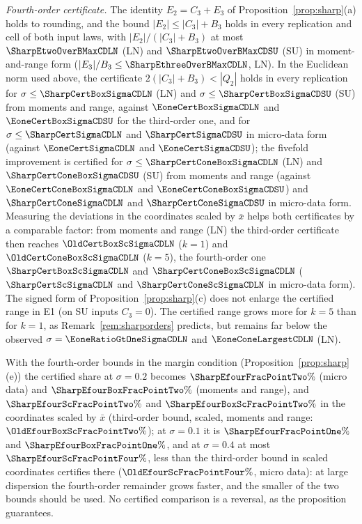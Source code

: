 \emph{Fourth-order certificate.} The identity $E_2=C_3+E_3$ of Proposition~\ref{prop:sharp}(a) holds to rounding, and the bound $|E_2|\le|C_3|+B_3$ holds in every replication and cell of both input laws, with $|E_2|/(|C_3|+B_3)$ at most $\SharpEtwoOverBMaxCDLN$ (LN) and $\SharpEtwoOverBMaxCDSU$ (SU) in moment-and-range form ($|E_3|/B_3\le\SharpEthreeOverBMaxCDLN$, LN). In the Euclidean norm used above, the certificate $2(|C_3|+B_3)<|Q_2|$ holds in every replication for $\sigma\le\SharpCertBoxSigmaCDLN$ (LN) and $\sigma\le\SharpCertBoxSigmaCDSU$ (SU) from moments and range, against $\EoneCertBoxSigmaCDLN$ and $\EoneCertBoxSigmaCDSU$ for the third-order one, and for $\sigma\le\SharpCertSigmaCDLN$ and $\SharpCertSigmaCDSU$ in micro-data form (against $\EoneCertSigmaCDLN$ and $\EoneCertSigmaCDSU$); the fivefold improvement is certified for $\sigma\le\SharpCertConeBoxSigmaCDLN$ (LN) and $\SharpCertConeBoxSigmaCDSU$ (SU) from moments and range (against $\EoneCertConeBoxSigmaCDLN$ and $\EoneCertConeBoxSigmaCDSU$) and $\SharpCertConeSigmaCDLN$ and $\SharpCertConeSigmaCDSU$ in micro-data form. Measuring the deviations in the coordinates scaled by $\bar x$ helps both certificates by a comparable factor: from moments and range (LN) the third-order certificate then reaches $\OldCertBoxScSigmaCDLN$ ($k=1$) and $\OldCertConeBoxScSigmaCDLN$ ($k=5$), the fourth-order one $\SharpCertBoxScSigmaCDLN$ and $\SharpCertConeBoxScSigmaCDLN$ ($\SharpCertScSigmaCDLN$ and $\SharpCertConeScSigmaCDLN$ in micro-data form). The signed form of Proposition~\ref{prop:sharp}(c) does not enlarge the certified range in E1 (on SU inputs $C_3=0$). The certified range grows more for $k=5$ than for $k=1$, as Remark~\ref{rem:sharporders} predicts, but remains far below the observed $\sigma=\EoneRatioGtOneSigmaCDLN$ and $\EoneConeLargestCDLN$ (LN).

With the fourth-order bounds in the margin condition (Proposition~\ref{prop:sharp}(e)) the certified share at $\sigma=0.2$ becomes $\SharpEfourFracPointTwo\%$ (micro data) and $\SharpEfourBoxFracPointTwo\%$ (moments and range), and $\SharpEfourScFracPointTwo\%$ and $\SharpEfourBoxScFracPointTwo\%$ in the coordinates scaled by $\bar x$ (third-order bound, scaled, moments and range: $\OldEfourBoxScFracPointTwo\%$); at $\sigma=0.1$ it is $\SharpEfourFracPointOne\%$ and $\SharpEfourBoxFracPointOne\%$, and at $\sigma=0.4$ at most $\SharpEfourScFracPointFour\%$, less than the third-order bound in scaled coordinates certifies there ($\OldEfourScFracPointFour\%$, micro data): at large dispersion the fourth-order remainder grows faster, and the smaller of the two bounds should be used. No certified comparison is a reversal, as the proposition guarantees.

